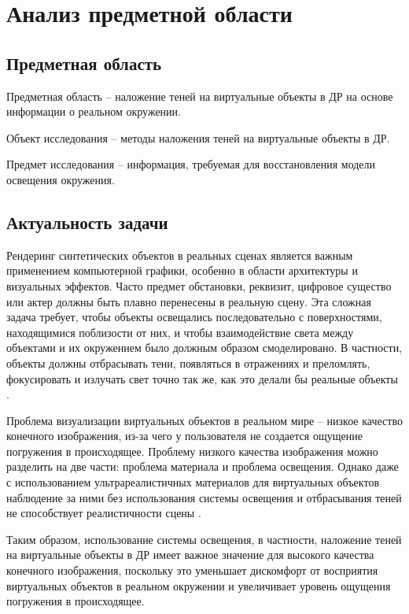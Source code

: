 \chapter{Анализ предметной области}

\section{Предметная область}

Предметная область -- наложение теней  на виртуальные объекты в ДР на основе информации о реальном окружении.

Объект исследования -- методы наложения теней  на виртуальные объекты в ДР.

Предмет исследования -- информация, требуемая для восстановления модели освещения окружения.

\section{Актуальность задачи}

Рендеринг синтетических объектов в реальных сценах является важным применением компьютерной графики, особенно в области архитектуры и визуальных эффектов. Часто предмет обстановки, реквизит, цифровое существо или актер должны быть плавно перенесены в реальную сцену. Эта сложная задача требует, чтобы объекты освещались последовательно с поверхностями, находящимися поблизости от них, и чтобы взаимодействие света между объектами и их окружением было должным образом смоделировано. В частности, объекты должны отбрасывать тени, появляться в отражениях и преломлять, фокусировать и излучать свет точно так же, как это делали бы реальные объекты \cite{debevec2008rendering}.

Проблема визуализации виртуальных объектов в реальном мире -- низкое качество конечного изображения, из-за чего у пользователя не создается ощущение погружения в происходящее. Проблему низкого качества изображения можно разделить на две части: проблема материала и проблема освещения. Однако даже с использованием ультрареалистичных материалов для виртуальных объектов наблюдение за ними без использования системы освещения и отбрасывания теней не способствует реалистичности сцены \cite{osti2019real}.

Таким образом, использование системы освещения, в частности, наложение теней на виртуальные объекты в ДР имеет важное значение для высокого качества конечного изображения, поскольку это уменьшает дискомфорт от восприятия виртуальных объектов в реальном окружении и увеличивает уровень ощущения погружения в происходящее.

